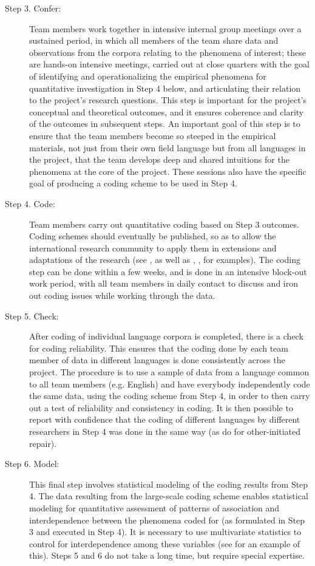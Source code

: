 \documentclass[output=paper,modfonts,nonflat]{langsci/langscibook}
\begin{document}
\begin{description}
    \item[Step 3. Confer:] Team members work together in intensive internal group meetings over a sustained period, in which all members of the team share data and observations from the corpora relating to the phenomena of interest; these are hands-on intensive meetings, carried out at close quarters with the goal of identifying and operationalizing the empirical phenomena for quantitative investigation in Step 4 below, and articulating their relation to the project’s research questions. This step is important for the project’s conceptual and theoretical outcomes, and it ensures coherence and clarity of the outcomes in subsequent steps. An important goal of this step is to ensure that the team members become so steeped in the empirical materials, not just from their own field language but from all languages in the project, that the team develops deep and shared intuitions for the phenomena at the core of the project. These sessions also have the specific goal of producing a coding scheme to be used in Step 4.
    \item[Step 4. Code:] Team members carry out quantitative coding based on Step 3 outcomes. Coding schemes should eventually be published, so as to allow the international research community to apply them in extensions and adaptations of the research (see , as well as \citealt{StiversEnfield2010}, \citealt{DingemanseEtAl2016}, for examples). The coding step can be done within a few weeks, and is done in an intensive block-out work period, with all team members in daily contact to discuss and iron out coding issues while working through the data. %
    \item[Step 5. Check:] After coding of individual language corpora is completed, there is a check for coding reliability. This ensures that the coding done by each team member of data in different languages is done consistently across the project. The procedure is to use a sample of data from a language common to all team members (e.g. English) and have everybody independently code the same data, using the coding scheme from Step 4, in order to then carry out a test of reliability and consistency in coding. It is then possible to report with confidence that the coding of different languages by different researchers in Step 4 was done in the same way (as \citealt{DingemanseEtAl2015} do for other-initiated repair).
    \item[Step 6. Model:] This final step involves statistical modeling of the coding results from Step 4. The data resulting from the large-scale coding scheme enables statistical modeling for quantitative assessment of patterns of association and interdependence between the phenomena coded for (as formulated in Step 3 and executed in Step 4). It is necessary to use multivariate statistics to control for interdependence among these variables (see \citealt{DingemanseEtAl2015} for an example of this). Steps 5 and 6 do not take a long time, but require special expertise.
\end{description}
\end{document}
